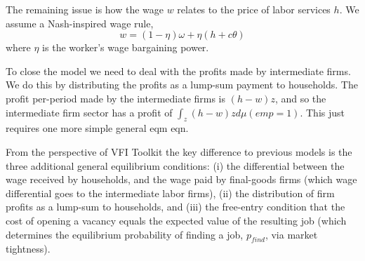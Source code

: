 The remaining issue is how the wage $w$ relates to the price of labor services $h$. We assume a Nash-inspired wage rule,
\begin{equation*}
 w=(1-\eta) \omega + \eta (h+ c \theta)
\end{equation*}
where $\eta$ is the worker's wage bargaining power.

To close the model we need to deal with the profits made by intermediate firms. We do this by distributing the profits as a lump-sum payment to households. The profit per-period made by the intermediate firms is $(h-w)z$, and so the intermediate firm sector has a profit of $\int_z (h-w)z d\mu(emp=1)$. This just requires one more simple general eqm eqn.

From the perspective of VFI Toolkit the key difference to previous models is the three additional general equilibrium conditions: (i) the differential between the wage received by households, and the wage paid by final-goods firms (which wage differential goes to the intermediate labor firms), (ii) the distribution of firm profits as a lump-sum to households, and (iii) the free-entry condition that the cost of opening a vacancy equals the expected value of the resulting job (which determines the equilibrium probability of finding a job, $p_{find}$, via market tightness).



